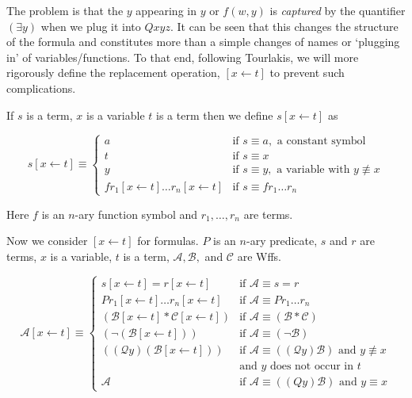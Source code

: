 \documentclass[12pt]{article}
\newcommand{\mc}[1]{\mathcal{#1}}
\begin{document}
The problem is that the $y$ appearing in $y$ or $f(w,y)$ is \textit{captured} by the quantifier $(\exists y)$ when we plug it into $Qxyz$. It can be seen that this changes the structure of the formula and constitutes more than a simple changes of names or `plugging in' of variables/functions. To that end, following Tourlakis, we will more rigorously define the replacement operation, $[x\leftarrow t]$ to prevent such complications.

If $s$ is a term, $x$ is a variable $t$ is a term then we define $s[x\leftarrow t]$ as

\begin{equation}
s[x\leftarrow t] \equiv \begin{cases}
a & \text{if } s \equiv a, \text{ a constant symbol}\\
t & \text{if } s\equiv x\\
y & \text{if } s \equiv y, \text{ a variable with } y \not\equiv x\\
fr_1[x\leftarrow t]\ldots r_n[x\leftarrow t] & \text{if } s\equiv fr_1\ldots r_n
\end{cases}
\end{equation}

Here $f$ is an $n$-ary function symbol and $r_1, \ldots, r_n$ are terms.

Now we consider $[x\leftarrow t]$ for formulas. $P$ is an $n$-ary predicate, $s$ and $r$ are terms, $x$ is a variable, $t$ is a term, $\mc{A}, \mc{B},$ and $\mc{C}$ are Wffs.

\begin{equation}
\mc{A}[x\leftarrow t] \equiv \begin{cases}
s[x\leftarrow t] = r[x\leftarrow t] & \text{if } \mc{A}\equiv s=r\\
Pr_1[x\leftarrow t]\ldots r_n[x\leftarrow t] & \text{if } \mc{A}\equiv Pr_1\ldots r_n\\
(\mc{B}[x\leftarrow t] \ast \mc{C}[x\leftarrow t]) & \text{if } \mc{A} \equiv (\mc{B} \ast \mc{C})\\
(\lnot (\mc{B}[x\leftarrow t])) & \text{if } \mc{A} \equiv (\lnot \mc{B})\\
((\mc{Q} y)(\mc{B}[x\leftarrow t])) & \text{if } \mc{A} \equiv ((\mc{Q} y)\mc{B}) \text{ and $y\not \equiv x$}\\
 & \text{and $y$ does not occur in $t$ }\\
 \mc{A} & \text{if } \mc{A} \equiv ((Q y)\mc{B}) \text{ and $y\equiv x$}
\end{cases}
\end{equation}
\end{document}
